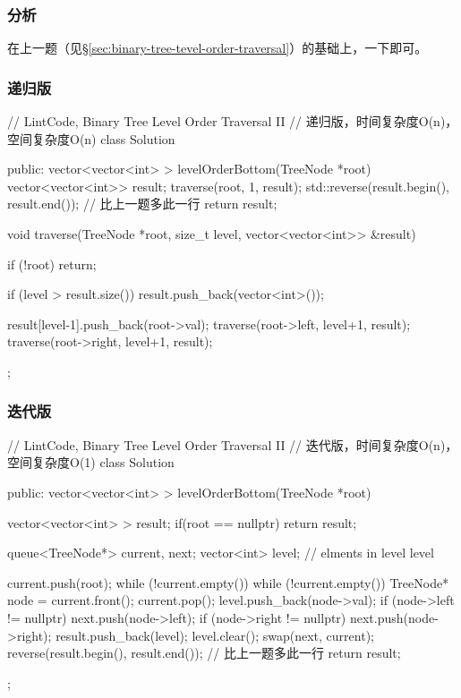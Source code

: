 \subsubsection{分析}
在上一题（见\S \ref{sec:binary-tree-tevel-order-traversal}）的基础上，一下即可。


\subsubsection{递归版}
\begin{Code}
// LintCode, Binary Tree Level Order Traversal II
// 递归版，时间复杂度O(n)，空间复杂度O(n)
class Solution {
public:
    vector<vector<int> > levelOrderBottom(TreeNode *root) {
        vector<vector<int>> result;
        traverse(root, 1, result);
        std::reverse(result.begin(), result.end()); // 比上一题多此一行
        return result;
    }

    void traverse(TreeNode *root, size_t level, vector<vector<int>> &result) {
        if (!root) return;

        if (level > result.size())
            result.push_back(vector<int>());

        result[level-1].push_back(root->val);
        traverse(root->left, level+1, result);
        traverse(root->right, level+1, result);
    }
};
\end{Code}


\subsubsection{迭代版}
\begin{Code}
// LintCode, Binary Tree Level Order Traversal II
// 迭代版，时间复杂度O(n)，空间复杂度O(1)
class Solution {
public:
    vector<vector<int> > levelOrderBottom(TreeNode *root) {
        vector<vector<int> > result;
        if(root == nullptr) return result;

        queue<TreeNode*> current, next;
        vector<int> level; // elments in level level

        current.push(root);
        while (!current.empty()) {
            while (!current.empty()) {
                TreeNode* node = current.front();
                current.pop();
                level.push_back(node->val);
                if (node->left != nullptr) next.push(node->left);
                if (node->right != nullptr) next.push(node->right);
            }
            result.push_back(level);
            level.clear();
            swap(next, current);
        }
        reverse(result.begin(), result.end()); // 比上一题多此一行
        return result;
    }
};
\end{Code}


